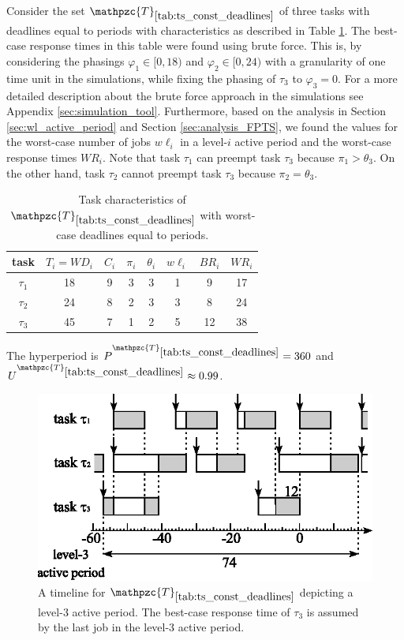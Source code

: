 Consider the set $\mathpzc{T}_{\ref{tab:ts_const_deadlines}}$ of three tasks with deadlines equal to periods with characteristics as described in Table \ref{tab:ts_const_deadlines}. The best-case response times in this table were found using brute force. This is, by considering the phasings $\varphi_1 \in [0,18)$ and $\varphi_2 \in [0,24)$ with a granularity of one time unit in the simulations, while fixing the phasing of $\tau_3$ to $\varphi_3 = 0$. For a more detailed description about the brute force approach in the simulations see Appendix \ref{sec:simulation_tool}. Furthermore, based on the analysis in Section \ref{sec:wl_active_period} and Section \ref{sec:analysis_FPTS}, we found the values for the worst-case number of jobs  $w\ell_i$ in a level-$i$ active period and the worst-case response times $WR_i$. Note that task $\tau_1$ can preempt task $\tau_3$ because $\pi_1 > \theta_3$. On the other hand, task $\tau_2$ cannot preempt task $\tau_3$ because $\pi_2 = \theta_3$. 

\begin{table}[h]
	\center
	\caption{Task characteristics of $\mathpzc{T}_{\ref{tab:ts_const_deadlines}}$ with worst-case deadlines equal to periods.}
	\label{tab:ts_const_deadlines}
	\begin{tabular}{c | c c c c | c c c }
		\hline 
		task & $T_i = WD_i$ & $C_i$ & $\pi_i$ & $\theta_i$ &  $w\ell_i$ & $BR_i$ & $WR_i$\\ 
		\hline 
		$\tau_1$& 18  & 9  & 3 & 3 &  1 & 9  & 17 \\ 
		$\tau_2$& 24  & 8  & 2 & 3 &  3  & 8  & 24 \\ 
		$\tau_3$& 45  & 7  & 1 & 2 &  5  & 12 & 38 \\ 
		\hline 
	\end{tabular}
	
	\small
	\item  The hyperperiod is $P^{\mathpzc{T}_{\ref{tab:ts_const_deadlines}}}=360$ and $U^{\mathpzc{T}_{\ref{tab:ts_const_deadlines}}} \approx 0.99$.
\end{table} 

\begin{figure}[h]
	\centering
	\includegraphics[width=.53\linewidth]{figures/example_1}
	\caption{A timeline for $\mathpzc{T}_{\ref{tab:ts_const_deadlines}}$ depicting a level-3 active period. The best-case response time of $\tau_3$ is assumed by the last job in the level-3 active period.}
	\label{fig:example_1}
\end{figure}


